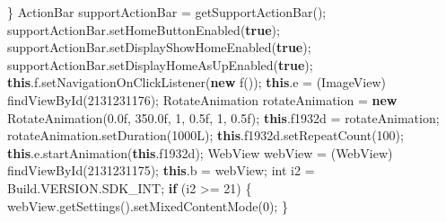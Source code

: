 \documentclass[
]{article}
\newenvironment{Shaded}{}{}
\newcommand{\BuiltInTok}[1]{\textcolor[rgb]{0.00,0.50,0.00}{#1}}
\newcommand{\ControlFlowTok}[1]{\textcolor[rgb]{0.00,0.44,0.13}{\textbf{#1}}}
\newcommand{\DataTypeTok}[1]{\textcolor[rgb]{0.56,0.13,0.00}{#1}}
\newcommand{\DecValTok}[1]{\textcolor[rgb]{0.25,0.63,0.44}{#1}}
\newcommand{\FloatTok}[1]{\textcolor[rgb]{0.25,0.63,0.44}{#1}}
\newcommand{\FunctionTok}[1]{\textcolor[rgb]{0.02,0.16,0.49}{#1}}
\newcommand{\KeywordTok}[1]{\textcolor[rgb]{0.00,0.44,0.13}{\textbf{#1}}}
\newcommand{\NormalTok}[1]{#1}
\newcommand{\OperatorTok}[1]{\textcolor[rgb]{0.40,0.40,0.40}{#1}}
\begin{document}
\begin{Shaded}
\begin{Highlighting}[]
        \OperatorTok{\}}
\NormalTok{        ActionBar supportActionBar }\OperatorTok{=} \FunctionTok{getSupportActionBar}\OperatorTok{();}
\NormalTok{        supportActionBar}\OperatorTok{.}\FunctionTok{setHomeButtonEnabled}\OperatorTok{(}\KeywordTok{true}\OperatorTok{);}
\NormalTok{        supportActionBar}\OperatorTok{.}\FunctionTok{setDisplayShowHomeEnabled}\OperatorTok{(}\KeywordTok{true}\OperatorTok{);}
\NormalTok{        supportActionBar}\OperatorTok{.}\FunctionTok{setDisplayHomeAsUpEnabled}\OperatorTok{(}\KeywordTok{true}\OperatorTok{);}
        \KeywordTok{this}\OperatorTok{.}\FunctionTok{f}\OperatorTok{.}\FunctionTok{setNavigationOnClickListener}\OperatorTok{(}\KeywordTok{new} \FunctionTok{f}\OperatorTok{());}
        \KeywordTok{this}\OperatorTok{.}\FunctionTok{e} \OperatorTok{=} \OperatorTok{(}\BuiltInTok{ImageView}\OperatorTok{)} \FunctionTok{findViewById}\OperatorTok{(}\DecValTok{2131231176}\OperatorTok{);}
\NormalTok{        RotateAnimation rotateAnimation }\OperatorTok{=} \KeywordTok{new} \FunctionTok{RotateAnimation}\OperatorTok{(}\FloatTok{0.0f}\OperatorTok{,} \FloatTok{350.0f}\OperatorTok{,} \DecValTok{1}\OperatorTok{,} \FloatTok{0.5f}\OperatorTok{,} \DecValTok{1}\OperatorTok{,} \FloatTok{0.5f}\OperatorTok{);}
        \KeywordTok{this}\OperatorTok{.}\FunctionTok{f1932d} \OperatorTok{=}\NormalTok{ rotateAnimation}\OperatorTok{;}
\NormalTok{        rotateAnimation}\OperatorTok{.}\FunctionTok{setDuration}\OperatorTok{(}\DecValTok{1000L}\OperatorTok{);}
        \KeywordTok{this}\OperatorTok{.}\FunctionTok{f1932d}\OperatorTok{.}\FunctionTok{setRepeatCount}\OperatorTok{(}\DecValTok{100}\OperatorTok{);}
        \KeywordTok{this}\OperatorTok{.}\FunctionTok{e}\OperatorTok{.}\FunctionTok{startAnimation}\OperatorTok{(}\KeywordTok{this}\OperatorTok{.}\FunctionTok{f1932d}\OperatorTok{);}
\NormalTok{        WebView webView }\OperatorTok{=} \OperatorTok{(}\NormalTok{WebView}\OperatorTok{)} \FunctionTok{findViewById}\OperatorTok{(}\DecValTok{2131231175}\OperatorTok{);}
        \KeywordTok{this}\OperatorTok{.}\FunctionTok{b} \OperatorTok{=}\NormalTok{ webView}\OperatorTok{;}
        \DataTypeTok{int}\NormalTok{ i2 }\OperatorTok{=}\NormalTok{ Build}\OperatorTok{.}\FunctionTok{VERSION}\OperatorTok{.}\FunctionTok{SDK\_INT}\OperatorTok{;}
        \ControlFlowTok{if} \OperatorTok{(}\NormalTok{i2 }\OperatorTok{\textgreater{}=} \DecValTok{21}\OperatorTok{)} \OperatorTok{\{}
\NormalTok{            webView}\OperatorTok{.}\FunctionTok{getSettings}\OperatorTok{().}\FunctionTok{setMixedContentMode}\OperatorTok{(}\DecValTok{0}\OperatorTok{);}
        \OperatorTok{\}}

\end{Highlighting}
\end{Shaded}
\end{document}
